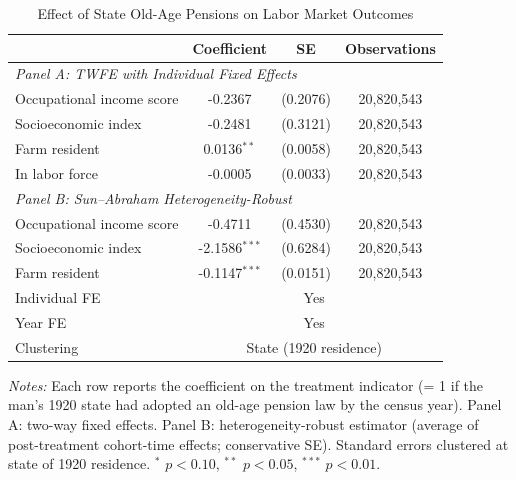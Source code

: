 \begin{table}[H]
\centering
\caption{Effect of State Old-Age Pensions on Labor Market Outcomes}
\label{tab:main}
\begin{threeparttable}
\begin{tabular}{lccc}
\toprule
 & Coefficient & SE & Observations \\
\midrule
\multicolumn{4}{l}{\textit{Panel A: TWFE with Individual Fixed Effects}} \\
Occupational income score & -0.2367 & (0.2076) & 20,820,543 \\
Socioeconomic index & -0.2481 & (0.3121) & 20,820,543 \\
Farm resident & 0.0136$^{**}$ & (0.0058) & 20,820,543 \\
In labor force & -0.0005 & (0.0033) & 20,820,543 \\
\midrule
\multicolumn{4}{l}{\textit{Panel B: Sun--Abraham Heterogeneity-Robust}} \\
Occupational income score & -0.4711 & (0.4530) & 20,820,543 \\
Socioeconomic index & -2.1586$^{***}$ & (0.6284) & 20,820,543 \\
Farm resident & -0.1147$^{***}$ & (0.0151) & 20,820,543 \\
\midrule
Individual FE & \multicolumn{3}{c}{Yes} \\
Year FE & \multicolumn{3}{c}{Yes} \\
Clustering & \multicolumn{3}{c}{State (1920 residence)} \\
\bottomrule
\end{tabular}
\begin{tablenotes}[flushleft]\small
\item \textit{Notes:} Each row reports the coefficient on the treatment indicator (= 1 if the man's 1920 state had adopted an old-age pension law by the census year). Panel A: two-way fixed effects. Panel B: \citet{sunAbraham2021} heterogeneity-robust estimator (average of post-treatment cohort-time effects; conservative SE). Standard errors clustered at state of 1920 residence. $^{*}$ $p<0.10$, $^{**}$ $p<0.05$, $^{***}$ $p<0.01$.
\end{tablenotes}
\end{threeparttable}
\end{table}

